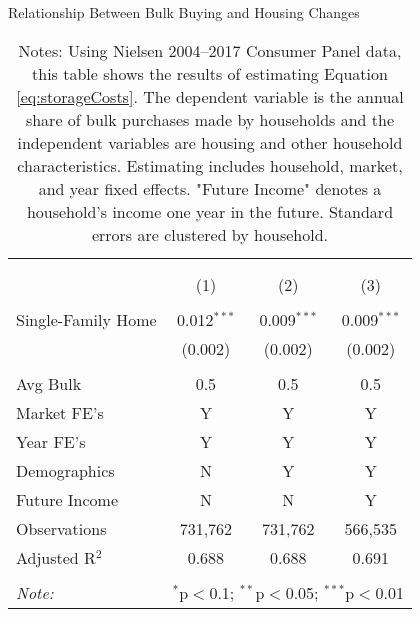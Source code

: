 \begin{table}[!htbp] \centering
  \caption{Relationship Between Bulk Buying and Housing Changes}
  \label{tab:storageCosts}
\begin{tabular}{@{\extracolsep{5pt}}lccc}
\\[-1.8ex]\hline
\hline \\[-1.8ex]
\\[-1.8ex] & (1) & (2) & (3)\\
\hline \\[-1.8ex]
 Single-Family Home & 0.012$^{***}$ & 0.009$^{***}$ & 0.009$^{***}$ \\
  & (0.002) & (0.002) & (0.002) \\
 \hline \\[-1.8ex]
Avg Bulk & 0.5 & 0.5 & 0.5 \\
Market FE's & Y & Y & Y \\
Year FE's & Y & Y & Y \\
Demographics & N & Y & Y \\
Future Income & N & N & Y \\
Observations & 731,762 & 731,762 & 566,535 \\
Adjusted R$^{2}$ & 0.688 & 0.688 & 0.691 \\
\hline
\hline \\[-1.8ex]
\textit{Note:}  & \multicolumn{3}{l}{$^{*}$p$<$0.1; $^{**}$p$<$0.05; $^{***}$p$<$0.01} \\
\end{tabular}
\caption*{Notes: Using Nielsen 2004--2017 Consumer Panel data, this table shows the results of estimating Equation \ref{eq:storageCosts}. The dependent variable is the annual share of bulk purchases made by households and the independent variables are housing and other household characteristics. Estimating includes household, market, and year fixed effects. "Future Income" denotes a household's income one year in the future. Standard errors are clustered by household.}
\end{table}

